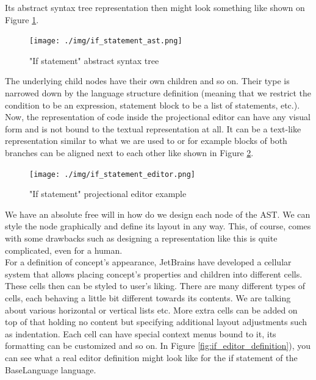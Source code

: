 \vspace{3mm}

Its abstract syntax tree representation then might look something like shown on Figure \ref{fig:if_ast}.
\\

\begin{figure}[h]
	\centering
	\texttt{[image: ./img/if\_statement\_ast.png]}
	\caption{"If statement" abstract syntax tree}
	\label{fig:if_ast}
\end{figure}

The underlying child nodes have their own children and so on.
Their type is narrowed down by the language structure definition (meaning that we restrict the condition to be an expression, statement block to be a list of statements, etc.).
\\

Now, the representation of code inside the projectional editor can have any visual form and is not bound to the textual representation at all.
It can be a text-like representation similar to what we are used to or for example blocks of both branches can be aligned next to each other like shown in Figure \ref{fig:if_editor}.
\\

\begin{figure}[h]
	\centering
	\hspace{-4mm}
	\texttt{[image: ./img/if\_statement\_editor.png]}
	\caption{"If statement" projectional editor example}
	\label{fig:if_editor}
\end{figure}

We have an absolute free will in how do we design each node of the AST.
We can style the node graphically and define its layout in any way.
This, of course, comes with some drawbacks such as designing a representation like this is quite complicated, even for a human.
\\

For a definition of concept's appearance, JetBrains have developed a cellular system that allows placing concept's properties and children into different cells.
These cells then can be styled to user's liking.
There are many different types of cells, each behaving a little bit different towards its contents.
We are talking about various horizontal or vertical lists etc.
More extra cells can be added on top of that holding no content but specifying additional layout adjustments such as indentation.
Each cell can have special context menus bound to it, its formatting can be customized and so on.
In Figure {\ref{fig:if_editor_definition})}, you can see what a real editor definition might look like for the if statement of the BaseLanguage language.


